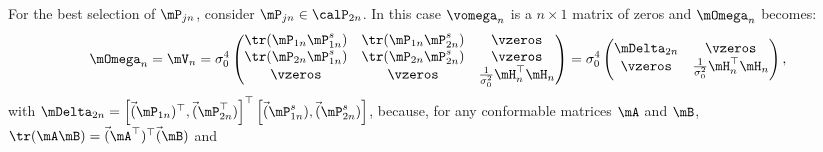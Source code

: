 \documentclass[english,12pt]{book}\usepackage[]{graphicx}\usepackage[]{xcolor}
\begin{document}
For the best selection of $\mP_{jn}$, consider $\mP_{jn}\in \calP_{2n}$. In this case $\vomega_n$ is a $n\times 1$ matrix of zeros and $\mOmega_n$ becomes:
\begin{equation*}
\mOmega_n = \mV_n = \sigma_0^4
          \begin{pmatrix}
          \tr(\mP_{1n}\mP_{1n}^s) & \tr(\mP_{1n}\mP_{2n}^s) & \vzeros \\
          \tr(\mP_{2n}\mP_{1n}^s) & \tr(\mP_{2n}\mP_{2n}^s) & \vzeros \\
          \vzeros & \vzeros & \frac{1}{\sigma_0^2}\mH_n^{\top}\mH_n
          \end{pmatrix} = 
          \sigma_0^4\begin{pmatrix}
          \mDelta_{2n} & \vzeros \\
          \vzeros & \frac{1}{\sigma_0^2}\mH_n^{\top}\mH_n
          \end{pmatrix},
\end{equation*}
%
with $\mDelta_{2n} = \left[\vec(\mP_{1n})^\top, \vec(\mP_{2n}^\top)\right]^\top\left[\vec(\mP_{1n}^s), \vec(\mP_{2n}^s)\right]$, because, for any conformable matrices $\mA$ and $\mB$, $\tr(\mA\mB) = \vec(\mA^\top)^\top\vec(\mB)$ and
\footnotesize
\end{document}
